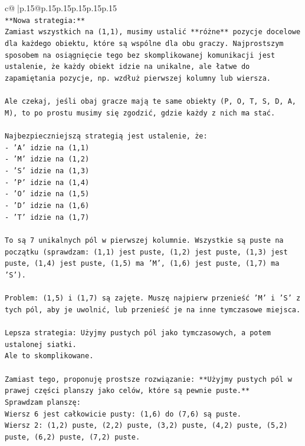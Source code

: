 \documentclass{article}
\begin{document}
{\begin{supertabular}{c@{$\;$}|p{.15\linewidth}@{}p{.15\linewidth}p{.15\linewidth}p{.15\linewidth}p{.15\linewidth}p{.15\linewidth}}
{{{\\ 
\texttt{**Nowa strategia:**} \\
\texttt{Zamiast wszystkich na (1,1), musimy ustalić **różne** pozycje docelowe dla każdego obiektu, które są wspólne dla obu graczy. Najprostszym sposobem na osiągnięcie tego bez skomplikowanej komunikacji jest ustalenie, że każdy obiekt idzie na unikalne, ale łatwe do zapamiętania pozycje, np. wzdłuż pierwszej kolumny lub wiersza.} \\
\\ 
\texttt{Ale czekaj, jeśli obaj gracze mają te same obiekty (P, O, T, S, D, A, M), to po prostu musimy się zgodzić, gdzie każdy z nich ma stać.} \\
\\ 
\texttt{Najbezpieczniejszą strategią jest ustalenie, że:} \\
\texttt{{-} 'A' idzie na (1,1)} \\
\texttt{{-} 'M' idzie na (1,2)} \\
\texttt{{-} 'S' idzie na (1,3)} \\
\texttt{{-} 'P' idzie na (1,4)} \\
\texttt{{-} 'O' idzie na (1,5)} \\
\texttt{{-} 'D' idzie na (1,6)} \\
\texttt{{-} 'T' idzie na (1,7)} \\
\\ 
\texttt{To są 7 unikalnych pól w pierwszej kolumnie. Wszystkie są puste na początku (sprawdzam: (1,1) jest puste, (1,2) jest puste, (1,3) jest puste, (1,4) jest puste, (1,5) ma 'M', (1,6) jest puste, (1,7) ma 'S').} \\
\\ 
\texttt{Problem: (1,5) i (1,7) są zajęte. Muszę najpierw przenieść 'M' i 'S' z tych pól, aby je uwolnić, lub przenieść je na inne tymczasowe miejsca.} \\
\\ 
\texttt{Lepsza strategia: Użyjmy pustych pól jako tymczasowych, a potem ustalonej siatki.} \\
\texttt{Ale to skomplikowane.} \\
\\ 
\texttt{Zamiast tego, proponuję prostsze rozwiązanie: **Użyjmy pustych pól w prawej części planszy jako celów, które są pewnie puste.**} \\
\texttt{Sprawdzam planszę:} \\
\texttt{Wiersz 6 jest całkowicie pusty: (1,6) do (7,6) są puste.} \\
\texttt{Wiersz 2: (1,2) puste, (2,2) puste, (3,2) puste, (4,2) puste, (5,2) puste, (6,2) puste, (7,2) puste.} \\
}}}
\end{supertabular}}
\end{document}
